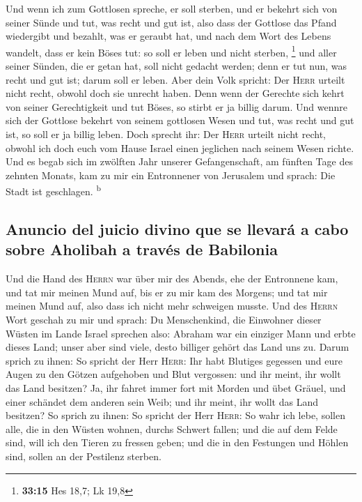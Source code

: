  Und wenn ich zum Gottlosen spreche, er soll sterben, und
er bekehrt sich von seiner Sünde und tut, was recht und gut ist,
 also dass der Gottlose das Pfand wiedergibt und bezahlt,
was er geraubt hat, und nach dem Wort des Lebens wandelt, dass er kein
Böses tut: so soll er leben und nicht sterben, \footnote{\textbf{33:15}
  Hes 18,7; Lk 19,8}  und aller seiner Sünden, die er
getan hat, soll nicht gedacht werden; denn er tut nun, was recht und gut
ist; darum soll er leben.  Aber dein Volk spricht: Der
\textsc{Herr} urteilt nicht recht, obwohl doch sie unrecht haben.
 Denn wenn der Gerechte sich kehrt von seiner
Gerechtigkeit und tut Böses, so stirbt er ja billig darum.
 Und wennre sich der Gottlose bekehrt von seinem
gottlosen Wesen und tut, was recht und gut ist, so soll er ja billig
leben.  Doch sprecht ihr: Der \textsc{Herr} urteilt nicht
recht, obwohl ich doch euch vom Hause Israel einen jeglichen nach seinem
Wesen richte.  Und es begab sich im zwölften Jahr unserer
Gefangenschaft, am fünften Tage des zehnten Monats, kam zu mir ein
Entronnener von Jerusalem und sprach: Die Stadt ist geschlagen.
\textsuperscript{b}

\hypertarget{anuncio-del-juicio-divino-que-se-llevaruxe1-a-cabo-sobre-aholibah-a-travuxe9s-de-babilonia}{%
\subsection{Anuncio del juicio divino que se llevará a cabo sobre
Aholibah a través de
Babilonia}\label{anuncio-del-juicio-divino-que-se-llevaruxe1-a-cabo-sobre-aholibah-a-travuxe9s-de-babilonia}}

 Und die Hand des \textsc{Herrn} war über mir des Abends,
ehe der Entronnene kam, und tat mir meinen Mund auf, bis er zu mir kam
des Morgens; und tat mir meinen Mund auf, also dass ich nicht mehr
schweigen musste.  Und des \textsc{Herrn} Wort geschah zu
mir und sprach:  Du Menschenkind, die Einwohner dieser
Wüsten im Lande Israel sprechen also: Abraham war ein einziger Mann und
erbte dieses Land; unser aber sind viele, desto billiger gehört das Land
uns zu.  Darum sprich zu ihnen: So spricht der Herr
\textsc{Herr}: Ihr habt Blutiges gegessen und eure Augen zu den Götzen
aufgehoben und Blut vergossen: und ihr meint, ihr wollt das Land
besitzen?  Ja, ihr fahret immer fort mit Morden und übet
Gräuel, und einer schändet dem anderen sein Weib; und ihr meint, ihr
wollt das Land besitzen?  So sprich zu ihnen: So spricht
der Herr \textsc{Herr}: So wahr ich lebe, sollen alle, die in den Wüsten
wohnen, durchs Schwert fallen; und die auf dem Felde sind, will ich den
Tieren zu fressen geben; und die in den Festungen und Höhlen sind,
sollen an der Pestilenz sterben.


